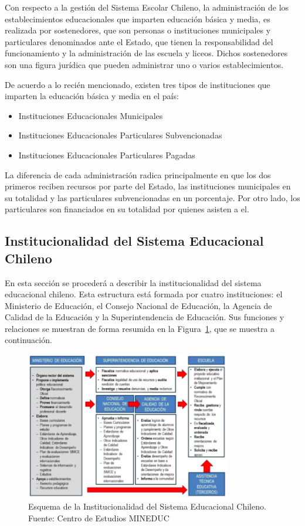 Con respecto a la gestión del Sistema Escolar Chileno, la administración de los establecimientos educacionales que imparten educación básica y media, es realizada por sostenedores, que son personas o instituciones municipales y particulares denominados ante el Estado, que tienen la responsabilidad del funcionamiento y la administración de las escuela y liceos. Dichos sostenedores son una figura jurídica que pueden administrar uno o varios establecimientos. 

De acuerdo a lo recién mencionado, existen tres tipos de instituciones que imparten la educación básica y media en el país:

\begin{itemize}
\item Instituciones Educacionales Municipales
\item Instituciones Educacionales Particulares Subvencionadas
\item Instituciones Educacionales Particulares Pagadas
\end{itemize}

La diferencia de cada administración radica principalmente en que los dos primeros reciben recursos por parte del Estado, las instituciones municipales en su totalidad y las particulares subvencionadas en un porcentaje. Por otro lado, los particulares son financiados en su totalidad por quienes asisten a el. 


\subsection{Institucionalidad del Sistema Educacional Chileno}
En esta sección se procederá a describir la institucionalidad del sistema educacional chileno. Esta estructura está formada por cuatro instituciones: el Ministerio de Educación, el Consejo Nacional de Educación, la Agencia de Calidad de la Educación y la Superintendencia de Educación. Sus funciones y relaciones se muestran de forma resumida en la Figura~\ref{fig:esquema}, que se muestra a continuación. 

\begin{figure}[H]
  \centering
    \includegraphics[width=0.8\textwidth]{Figuras/Institucionalidad}
      \caption{Esquema de la Institucionalidad del Sistema Educacional Chileno. Fuente: Centro de Estudios MINEDUC}
    \label{fig:esquema}
\end{figure}

